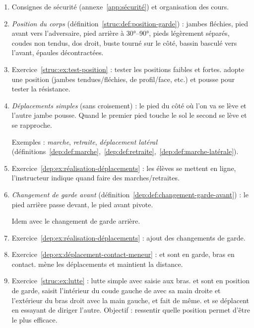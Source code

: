 \begin{enumerate}
	\item Consignes de sécurité (annexe~\ref{app:sécurité}) et organisation des cours.
	
	\item \emph{Position du corps} (définition~\ref{struc:def:position-garde}) : jambes fléchies, pied avant vers l'adversaire, pied arrière à \ang{30}--\ang{90}, pieds légèrement séparés, coudes non tendus, dos droit, buste tourné sur le côté, bassin basculé vers l'avant, épaules décontractées.
	
	\item Exercice~\ref{struc:ex:test-position} : tester les positions faibles et fortes.
	\D adopte une position (jambes tendues/fléchies, de profil/face, etc.) et \A pousse pour tester la résistance.
	
	\item \emph{Déplacements simples} (sans croisement) : le pied du côté où l'on va se lève et l'autre jambe pousse.
	Quand le premier pied touche le sol le second se lève et se rapproche.
	
	Exemples : \emph{marche}, \emph{retraite}, \emph{déplacement latéral} (définitions~\ref{dep:def:marche},~\ref{dep:def:retraite},~\ref{dep:def:marche-latérale}).
	
	\item Exercice~\ref{dep:ex:réalisation-déplacements} : les élèves se mettent en ligne, l'instructeur indique quand faire des marches/retraites.
	
	\item \emph{Changement de garde avant} (définition~\ref{dep:def:changement-garde-avant}) : le pied arrière passe devant, le pied avant pivote.
	
	Idem avec le changement de garde arrière.
	
	\item Exercice~\ref{dep:ex:réalisation-déplacements} : ajout des changements de garde.
	
	\item Exercice~\ref{dep:ex:déplacement-contact-meneur} : \A et \D sont en garde, bras en contact.
	\A mène les déplacements et \D maintient la distance.
	
	\item Exercice~\ref{struc:ex:lutte} : lutte simple avec saisie aux bras.
	\A et \D sont en position de garde, \A saisit l'intérieur du coude gauche de \D avec sa main droite et l'extérieur du bras droit avec la main gauche, et \D fait de même.
	\A et \D se déplacent en essayant de diriger l'autre.
	Objectif : ressentir quelle position permet d'être le plus efficace.
	

\end{enumerate}

